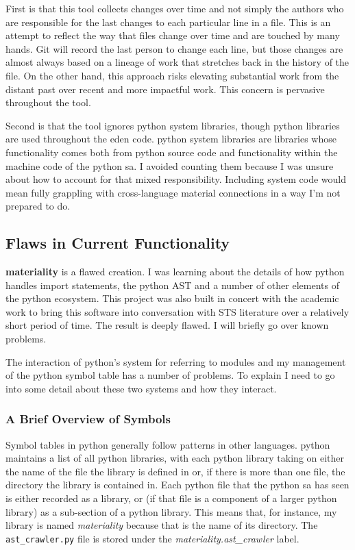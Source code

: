 \documentclass[a4paper,man,natbib,floatsintext]{apa6}
\begin{document}
  First is that this tool collects changes over time and not simply the authors who are responsible for the last changes to each particular line in a file. This is an attempt to reflect the way that files change over time and are touched by many hands. Git will record the last person to change each line, but those changes are almost always based on a lineage of work that stretches back in the history of the file. On the other hand, this approach risks elevating substantial work from the distant past over recent and more impactful work. This concern is pervasive throughout the tool.

  Second is that the tool ignores \Gls{python} system libraries, though \Gls{python} libraries are used throughout the \acrshort{eden} code. \Gls{python} system libraries are libraries whose functionality comes both from \Gls{python} source code and functionality within the machine code of the \Gls{python} \gls{sa}. I avoided counting them because I was unsure about how to account for that mixed responsibility. Including system code would mean fully grappling with cross-language material connections in a way I'm not prepared to do.

  \subsection{Flaws in Current Functionality}
  \textbf{materiality} is a flawed creation. I was learning about the details of how \Gls{python} handles import statements, the \Gls{python} AST and a number of other elements of the \Gls{python} ecosystem. This project was also built in concert with the academic work to bring this software into conversation with STS literature over a relatively short period of time. The result is deeply flawed. I will briefly go over known problems.

  The interaction of \Gls{python}'s system for referring to modules and my management of the \Gls{python} symbol table has a number of problems. To explain I need to go into some detail about these two systems and how they interact.

  \subsubsection{A Brief Overview of Symbols}
  Symbol tables in \Gls{python} generally follow patterns in other languages. \Gls{python} maintains a list of all \Gls{python} libraries, with each \Gls{python} library taking on either the name of the file the library is defined in or, if there is more than one file, the directory the library is contained in. Each \Gls{python} file that the \Gls{python} \gls{sa} has seen is either recorded as a library, or (if that file is a component of a larger python library) as a sub-section of a \Gls{python} library. This means that, for instance, my library is named \textit{materiality} because that is the name of its directory. The \verb|ast_crawler.py| file is stored under the \textit{materiality.ast\_crawler} label.
\end{document}

